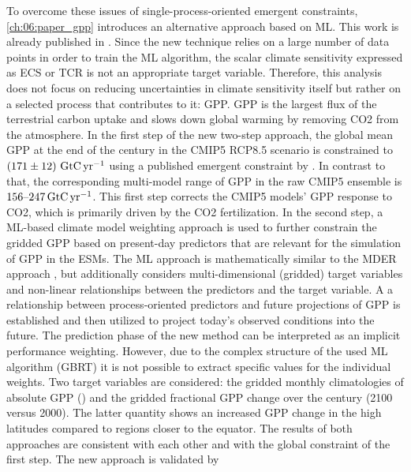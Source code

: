 To overcome these issues of single-process-oriented emergent constraints,
\cref{ch:06:paper_gpp} introduces an alternative approach based on \ac{ML}.
This work is already published in \textcite{Schlund2020}. Since the new
technique relies on a large number of data points in order to train the \ac{ML}
algorithm, the scalar climate sensitivity expressed as \ac{ECS} or \ac{TCR} is
not an appropriate target variable. Therefore, this analysis does not focus on
reducing uncertainties in climate sensitivity itself but rather on a selected
process that contributes to it: \ac{GPP}. \ac{GPP} is the largest flux of the
terrestrial carbon uptake and slows down global warming by removing \ac{CO2}
from the atmosphere. In the first step of the new two-step approach, the global
mean \ac{GPP} at the end of the  century in the \acs{CMIP}5
\acs{RCP}8.5 scenario is constrained to $\pmrangeunit{171}{12}{\GtCyr{}}$ using
a published emergent constraint by \textcite{Wenzel2016}. In contrast to that,
the corresponding multi-model range of \ac{GPP} in the raw \acs{CMIP}5 ensemble
is $\rangeunit{156}{247}{\GtCyr{}}$. This first step corrects the \acs{CMIP}5
models' \ac{GPP} response to \ac{CO2}, which is primarily driven by the
\ac{CO2} fertilization. In the second step, a \ac{ML}-based climate model
weighting approach is used to further constrain the gridded \ac{GPP} based on
present-day predictors that are relevant for the simulation of \ac{GPP} in the
\acp{ESM}. The \ac{ML} approach is mathematically similar to the \ac{MDER}
approach \autocite{Karpechko2013, Senftleben2020, Wenzel2016a}, but
additionally considers multi-dimensional (gridded) target variables and
non-linear relationships between the predictors and the target variable. A a
relationship between process‐oriented predictors and future projections of
\ac{GPP} is established and then utilized to project today's observed
conditions into the future. The prediction phase of the new method can be
interpreted as an implicit performance weighting. However, due to the complex
structure of the used \ac{ML} algorithm (\ac{GBRT}) it is not possible to
extract specific values for the individual weights. Two target variables are
considered: the gridded monthly climatologies of absolute \ac{GPP}
() and the gridded fractional \ac{GPP} change over the
 century (2100 versus 2000). The latter quantity shows an increased
\acs{GPP} change in the high latitudes compared to regions closer to the
equator. The results of both approaches are consistent with each other and with
the global constraint of the first step. The new approach is validated by
